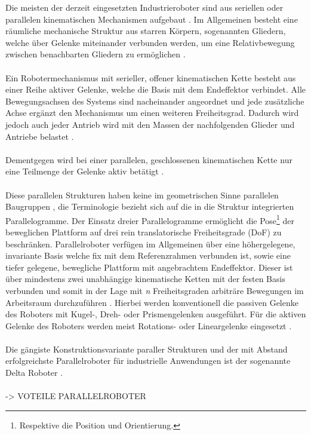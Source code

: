 \documentclass[Bachelor, BMR, ngerman]{twbook}
\begin{document}
    Die meisten der derzeit eingesetzten Industrieroboter sind aus seriellen oder parallelen kinematischen Mechanismen aufgebaut \cite{SiKh16}. Im Allgemeinen besteht eine räumliche mechanische Struktur aus starren Körpern, sogenannten Gliedern, welche über Gelenke miteinander verbunden werden, um eine Relativbewegung zwischen benachbarten Gliedern zu ermöglichen \cite{LyPa17}.\\
    \\
    Ein Robotermechanismus mit serieller, offener kinematischen Kette besteht aus einer Reihe aktiver Gelenke, welche die Basis mit dem Endeffektor verbindet. Alle Bewegungsachsen des Systems sind nacheinander angeordnet und jede zusätzliche Achse ergänzt den Mechanismus um einen weiteren Freiheitsgrad.  Dadurch wird jedoch auch jeder Antrieb wird mit den Massen der nachfolgenden Glieder und Antriebe belastet \cite{Ne06}.\\
    \\
    Dementgegen wird bei einer parallelen, geschlossenen kinematischen Kette nur eine Teilmenge der Gelenke aktiv betätigt \cite{LyPa17}.\\ 
    \\
    Diese parallelen Strukturen haben keine im geometrischen Sinne parallelen Baugruppen \cite{Ne06}, die Terminologie bezieht sich auf die in die Struktur integrierten Parallelogramme. Der Einsatz dreier Parallelogramme ermöglicht die Pose\footnote{Respektive die Position und Orientierung.} der beweglichen Plattform auf drei rein translatorische Freiheitsgrade (DoF) zu beschränken. Parallelroboter verfügen im Allgemeinen über eine höhergelegene, invariante Basis welche fix mit dem Referenzrahmen verbunden ist, sowie eine tiefer gelegene, bewegliche Plattform mit angebrachtem Endeffektor. Dieser ist über mindestens zwei unabhängige kinematische Ketten mit der festen Basis verbunden und somit in der Lage mit \textit{n} Freiheitsgraden arbiträre Bewegungen im Arbeitsraum durchzuführen \cite{SiKh16,StCa03}. Hierbei werden konventionell die passiven Gelenke des Roboters mit Kugel-, Dreh- oder Prismengelenken ausgeführt. Für die aktiven Gelenke des Roboters werden meist Rotations- oder Lineargelenke eingesetzt \cite{StCa03}.\\
    \\
    Die gängiste Konstruktionsvariante paraller Strukturen und der mit Abstand erfolgreichste Parallelroboter für industrielle Anwendungen ist der sogenannte Delta Roboter \cite{CrLe17,SoVa18}.\\
    \\
    -> VOTEILE PARALLELROBOTER
\end{document}
